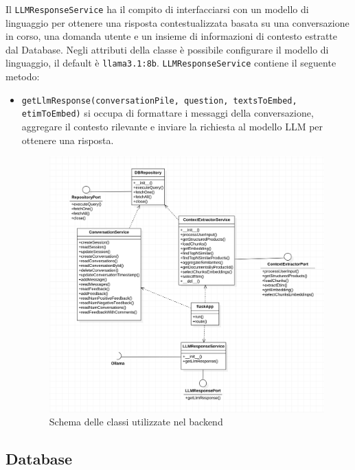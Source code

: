 Il \texttt{LLMResponseService} ha il compito di interfacciarsi con un modello di linguaggio per ottenere una risposta contestualizzata basata su una conversazione in corso, una domanda utente e un insieme di informazioni di contesto estratte dal Database.
Negli attributi della classe \`e possibile configurare il modello di linguaggio, il default \`e \texttt{llama3.1:8b}.
\texttt{LLMResponseService} contiene il seguente metodo:
\begin{itemize}
    \item \texttt{getLlmResponse(conversationPile, question, textsToEmbed, etimToEmbed)} si occupa di formattare i messaggi della conversazione, aggregare il contesto rilevante e inviare la richiesta al modello LLM per ottenere una risposta.
\begin{figure}[H]
    \centering
    \includegraphics[width=\textwidth]{images/BackendUML.png}
    \caption{Schema delle classi utilizzate nel backend}
    \label{fig:architettura}
\end{figure}

\end{itemize}\subsection{Database}
